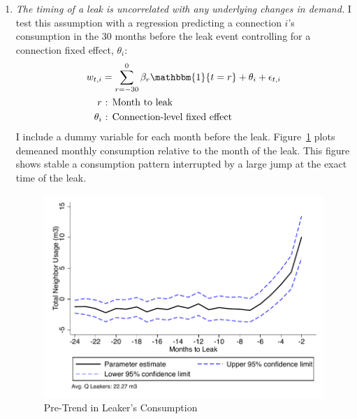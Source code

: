 \documentclass[12pt]{article}
\begin{document}
\begin{appendices}
\begin{enumerate}
	\item \textit{ The timing of a leak is uncorrelated with any underlying changes in demand. }  I test this assumption with a regression predicting a connection $i$'s consumption in the 30 months before the leak event controlling for a connection fixed effect, $\theta_{i}$:  
\begin{align*}
w_{t,i} &=  \sum_{r=-30}^{0} \beta_{r} \mathbbm{1} \{t=r\}  +  \theta_{i} + \epsilon_{t,i} \\
r 		 &\text{ : Month to leak}\\
\theta_i &\text{ : Connection-level fixed effect}
\end{align*}
	I include a dummy variable for each month before the leak.  Figure~\ref{figure:leakpretrend} plots demeaned monthly consumption relative to the month of the leak.  This figure shows stable a consumption pattern interrupted by a large jump at the exact time of the leak.
\begin{figure}
\centering
\caption{Pre-Trend in Leaker's Consumption}\label{figure:leakpretrend}
\begin{center}
\includegraphics[scale=.7]{tables/leakers_pre_2.pdf}
\end{center}
\end{figure}


\end{enumerate}
\end{appendices}
\end{document}
